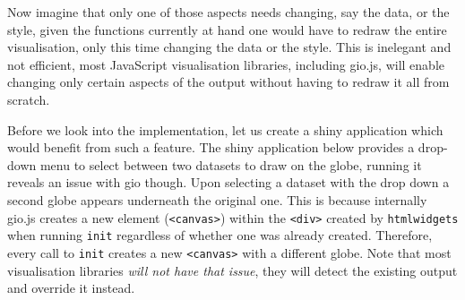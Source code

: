 \documentclass[
  10pt,
]{krantz}
\begin{document}
Now imagine that only one of those aspects needs changing, say the data, or the style, given the functions currently at hand one would have to redraw the entire visualisation, only this time changing the data or the style. This is inelegant and not efficient, most JavaScript visualisation libraries, including gio.js, will enable changing only certain aspects of the output without having to redraw it all from scratch.

Before we look into the implementation, let us create a shiny application which would benefit from such a feature. The shiny application below provides a drop-down menu to select between two datasets to draw on the globe, running it reveals an issue with gio though. Upon selecting a dataset with the drop down a second globe appears underneath the original one. This is because internally gio.js creates a new element (\texttt{\textless{}canvas\textgreater{}}) within the \texttt{\textless{}div\textgreater{}} created by \texttt{htmlwidgets} when running \texttt{init} regardless of whether one was already created. Therefore, every call to \texttt{init} creates a new \texttt{\textless{}canvas\textgreater{}} with a different globe. Note that most visualisation libraries \emph{will not have that issue}, they will detect the existing output and override it instead.
\end{document}
